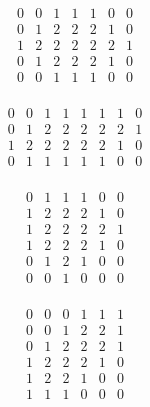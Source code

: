 \documentclass[12pt]{article}
\begin{document}
\begin{equation}
	\begin{matrix}
		0&0&1&1&1&0&0\\
		0&1&2&2&2&1&0\\
		1&2&2&2&2&2&1\\
		0&1&2&2&2&1&0\\
		0&0&1&1&1&0&0\\
	\end{matrix}
\end{equation}

\begin{equation}
	\begin{matrix}
		0&0&1&1&1&1&1&0\\
		0&1&2&2&2&2&2&1\\
		1&2&2&2&2&2&1&0\\
		0&1&1&1&1&1&0&0\\
	\end{matrix}
\end{equation}

\begin{equation}
	\begin{matrix}
		0&1&1&1&0&0\\
		1&2&2&2&1&0\\
		1&2&2&2&2&1\\
		1&2&2&2&1&0\\
		0&1&2&1&0&0\\
		0&0&1&0&0&0\\
	\end{matrix}
\end{equation}

\begin{equation}
	\begin{matrix}
		0&0&0&1&1&1\\
		0&0&1&2&2&1\\
		0&1&2&2&2&1\\
		1&2&2&2&1&0\\
		1&2&2&1&0&0\\
		1&1&1&0&0&0\\
	\end{matrix}
\end{equation}





\newpage
\appendix
\appendixpage
\addappheadtotoc
\end{document}
